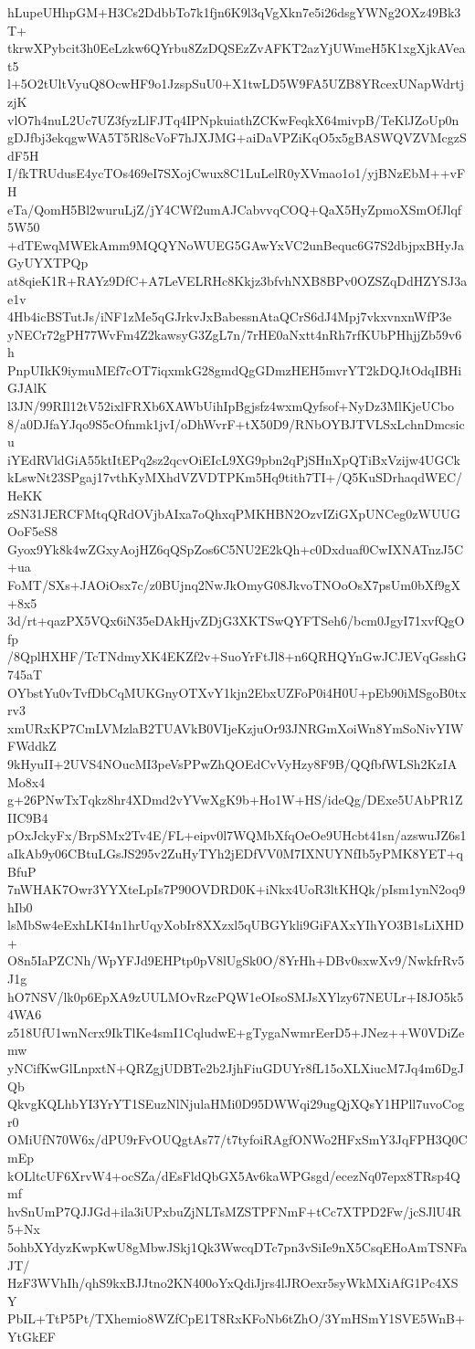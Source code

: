 hLupeUHhpGM+H3Cs2DdbbTo7k1fjn6K9l3qVgXkn7e5i26dsgYWNg2OXz49Bk3T+
tkrwXPybcit3h0EeLzkw6QYrbu8ZzDQSEzZvAFKT2azYjUWmeH5K1xgXjkAVeat5
l+5O2tUltVyuQ8OcwHF9o1JzspSuU0+X1twLD5W9FA5UZB8YRcexUNapWdrtjzjK
vlO7h4nuL2Uc7UZ3fyzLlFJTq4IPNpkuiathZCKwFeqkX64mivpB/TeKlJZoUp0n
gDJfbj3ekqgwWA5T5Rl8cVoF7hJXJMG+aiDaVPZiKqO5x5gBASWQVZVMcgzSdF5H
I/fkTRUdusE4ycTOs469eI7SXojCwux8C1LuLelR0yXVmao1o1/yjBNzEbM++vFH
eTa/QomH5Bl2wuruLjZ/jY4CWf2umAJCabvvqCOQ+QaX5HyZpmoXSmOfJlqf5W50
+dTEwqMWEkAmm9MQQYNoWUEG5GAwYxVC2unBequc6G7S2dbjpxBHyJaGyUYXTPQp
at8qieK1R+RAYz9DfC+A7LeVELRHc8Kkjz3bfvhNXB8BPv0OZSZqDdHZYSJ3ae1v
4Hb4icBSTutJs/iNF1zMe5qGJrkvJxBabessnAtaQCrS6dJ4Mpj7vkxvnxnWfP3e
yNECr72gPH77WvFm4Z2kawsyG3ZgL7n/7rHE0aNxtt4nRh7rfKUbPHhjjZb59v6h
PnpUIkK9iymuMEf7cOT7iqxmkG28gmdQgGDmzHEH5mvrYT2kDQJtOdqIBHiGJAlK
l3JN/99RIl12tV52ixlFRXb6XAWbUihIpBgjsfz4wxmQyfsof+NyDz3MlKjeUCbo
8/a0DJfaYJqo9S5cOfnmk1jvI/oDhWvrF+tX50D9/RNbOYBJTVLSxLchnDmcsicu
iYEdRVldGiA55ktItEPq2sz2qcvOiEIcL9XG9pbn2qPjSHnXpQTiBxVzijw4UGCk
kLswNt23SPgaj17vthKyMXhdVZVDTPKm5Hq9tith7TI+/Q5KuSDrhaqdWEC/HeKK
zSN31JERCFMtqQRdOVjbAIxa7oQhxqPMKHBN2OzvIZiGXpUNCeg0zWUUGOoF5eS8
Gyox9Yk8k4wZGxyAojHZ6qQSpZos6C5NU2E2kQh+c0Dxduaf0CwIXNATnzJ5C+ua
FoMT/SXs+JAOiOsx7c/z0BUjnq2NwJkOmyG08JkvoTNOoOsX7psUm0bXf9gX+8x5
3d/rt+qazPX5VQx6iN35eDAkHjvZDjG3XKTSwQYFTSeh6/bcm0JgyI71xvfQgOfp
/8QplHXHF/TcTNdmyXK4EKZf2v+SuoYrFtJl8+n6QRHQYnGwJCJEVqGsshG745aT
OYbstYu0vTvfDbCqMUKGnyOTXvY1kjn2EbxUZFoP0i4H0U+pEb90iMSgoB0txrv3
xmURxKP7CmLVMzlaB2TUAVkB0VIjeKzjuOr93JNRGmXoiWn8YmSoNivYIWFWddkZ
9kHyuII+2UVS4NOucMI3peVsPPwZhQOEdCvVyHzy8F9B/QQfbfWLSh2KzIAMo8x4
g+26PNwTxTqkz8hr4XDmd2vYVwXgK9b+Ho1W+HS/ideQg/DExe5UAbPR1ZIIC9B4
pOxJckyFx/BrpSMx2Tv4E/FL+eipv0l7WQMbXfqOeOe9UHcbt41sn/azswuJZ6s1
aIkAb9y06CBtuLGsJS295v2ZuHyTYh2jEDfVV0M7IXNUYNfIb5yPMK8YET+qBfuP
7nWHAK7Owr3YYXteLpIs7P90OVDRD0K+iNkx4UoR3ltKHQk/pIsm1ynN2oq9hIb0
lsMbSw4eExhLKI4n1hrUqyXobIr8XXzxl5qUBGYkli9GiFAXxYIhYO3B1sLiXHD+
O8n5IaPZCNh/WpYFJd9EHPtp0pV8lUgSk0O/8YrHh+DBv0sxwXv9/NwkfrRv5J1g
hO7NSV/lk0p6EpXA9zUULMOvRzcPQW1eOIsoSMJsXYlzy67NEULr+I8JO5k54WA6
z518UfU1wnNcrx9IkTlKe4smI1CqludwE+gTygaNwmrEerD5+JNez++W0VDiZemw
yNCifKwGlLnpxtN+QRZgjUDBTe2b2JjhFiuGDUYr8fL15oXLXiucM7Jq4m6DgJQb
QkvgKQLhbYI3YrYT1SEuzNlNjulaHMi0D95DWWqi29ugQjXQsY1HPll7uvoCogr0
OMiUfN70W6x/dPU9rFvOUQgtAs77/t7tyfoiRAgfONWo2HFxSmY3JqFPH3Q0CmEp
kOLltcUF6XrvW4+ocSZa/dEsFldQbGX5Av6kaWPGsgd/ecezNq07epx8TRsp4Qmf
hvSnUmP7QJJGd+ila3iUPxbuZjNLTsMZSTPFNmF+tCc7XTPD2Fw/jcSJlU4R5+Nx
5ohbXYdyzKwpKwU8gMbwJSkj1Qk3WwcqDTc7pn3vSiIe9nX5CsqEHoAmTSNFaJT/
HzF3WVhIh/qhS9kxBJJtno2KN400oYxQdiJjrs4lJROexr5syWkMXiAfG1Pc4XSY
PbIL+TtP5Pt/TXhemio8WZfCpE1T8RxKFoNb6tZhO/3YmHSmY1SVE5WnB+YtGkEF
